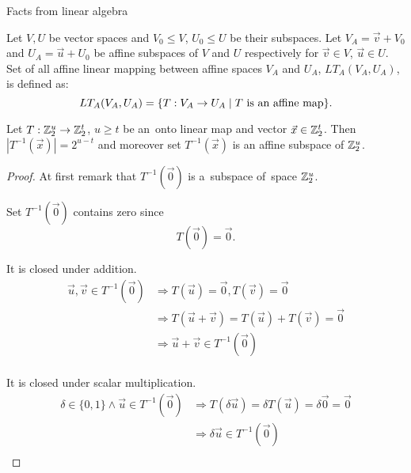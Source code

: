 \begin{chapter}{Facts from linear algebra}
\begin{definition}
Let $V, U$ be vector spaces and $V_0 \leq V$, $U_0 \leq U$ be their subspaces. Let $V_A = \vec{v} + V_0$ and $U_A = \vec{u} + U_0$ be affine subspaces of $V$ and $U$ respectively for $\vec{v} \in V$, $\vec{u} \in U$. Set of all affine linear mapping between affine spaces $V_A$ and $U_A$, $LT_A(V_A, U_A)$, is defined as:
\[
	LT_A(V_A, U_A) = \{ T: V_A \rightarrow U_A \mid T \text{ is an affine map} \} \text{.}
\]
\end{definition}

\begin{lemma}
\label{lemma-linear-transformation-domain-distribution}
Let $T: \mathbb{Z}_{2}^{u} \rightarrow \mathbb{Z}_{2}^{t}$, $u \geq t$ be an~onto linear map and vector $\vec{x} \in \mathbb{Z}_{2}^{t}$. Then $|T^{-1}(\vec{x})| = 2 ^ {u - t}$ and moreover set $T^{-1}(\vec{x})$ is an affine subspace of $\mathbb{Z}_{2}^{u}$.
\end{lemma}
\begin{proof}
At first remark that $T^{-1}(\vec{0})$ is a~subspace of~space $\mathbb{Z}_{2}^{u}$.

Set $T^{-1}(\vec{0})$ contains zero since
\[ T(\vec{0}) = \vec{0} \text{.} \]

It is closed under addition.
\[
\begin{split}
\vec{u}, \vec{v} \in T^{-1}(\vec{0}) 
	& \Rightarrow T(\vec{u}) = \vec{0}, T(\vec{v}) = \vec{0} \\ 
	& \Rightarrow T(\vec{u} + \vec{v}) = T(\vec{u}) + T(\vec{v}) = \vec{0} \\ 
	& \Rightarrow \vec{u} + \vec{v} \in T^{-1}(\vec{0}) \\
\end{split}
\]

It is closed under scalar multiplication.
\[
\begin{split}
\delta \in \{0, 1\} \wedge \vec{u} \in T^{-1}(\vec{0}) 
	& \Rightarrow T(\delta \vec{u}) = \delta T(\vec{u}) = \delta \vec{0} = \vec{0} \\
	& \Rightarrow \delta \vec{u} \in T^{-1}(\vec{0}) \\
\end{split}
\]


\end{proof}
\end{chapter}
